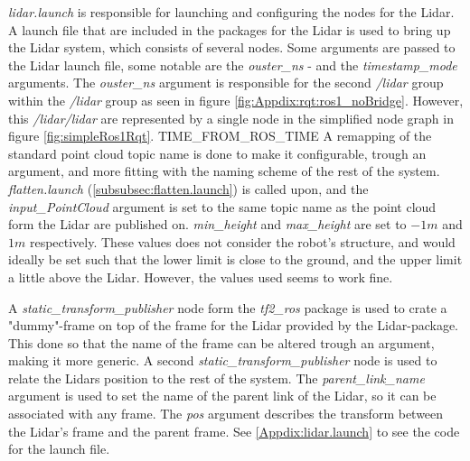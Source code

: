 \label{subsubsec:lidar.launch}
\textit{lidar.launch} is responsible for launching and configuring the nodes for the Lidar. A launch file that are included in the packages for the Lidar is used to bring up the Lidar system, which  consists of several nodes. Some arguments are passed to the Lidar launch file, some notable are the \textit{ouster\_ns} - and the  \textit{timestamp\_mode} arguments. The \textit{ouster\_ns} argument is responsible for the second \textit{/lidar} group within the \textit{/lidar} group as seen in figure \ref{fig:Appdix:rqt:ros1_noBridge}. However, this \textit{/lidar/lidar} are represented by a single node in the simplified node graph in figure \ref{fig:simpleRos1Rqt}. TIME\_FROM\_ROS\_TIME A remapping of the standard point cloud topic name is done to make it configurable, trough an argument, and more fitting with the naming scheme of the rest of the system. \textit{flatten.launch} (\ref{subsubsec:flatten.launch}) is called upon, and the \textit{input\_PointCloud} argument is set to the same topic name as the point cloud form the Lidar are published on. \textit{min\_height} and \textit{max\_height} are set to $-1 m$ and $1 m$ respectively. These values does not consider the robot's structure, and would ideally be set such that the lower limit is close to the ground, and the upper limit a little above the Lidar. However, the values used seems to work fine. 

A \textit{static\_transform\_publisher} node form the \textit{tf2\_ros} package is used to crate a "dummy"-frame on top of the frame for the Lidar provided by the Lidar-package. This done so that the name of the frame can be altered trough an argument, making it more generic. A second \textit{static\_transform\_publisher} node is used to relate the Lidars position to the rest of the system. The \textit{parent\_link\_name} argument is used to set the name of the parent link of the Lidar, so it can be associated with any frame. The \textit{pos} argument describes the transform between the Lidar's frame and the parent frame. See \ref{Appdix:lidar.launch} to see the code for the launch file.

